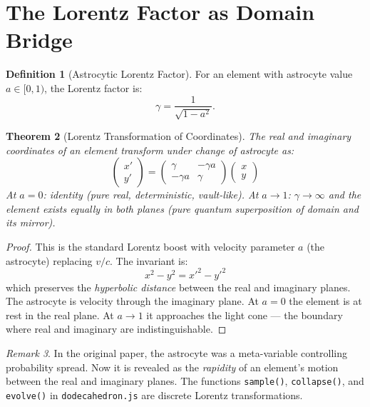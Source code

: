 \documentclass[12pt,a4paper]{article}
\newtheorem{theorem}{Theorem}[section]
\theoremstyle{definition}
\newtheorem{definition}[theorem]{Definition}
\theoremstyle{remark}
\newtheorem{remark}[theorem]{Remark}
\begin{document}
\section{The Lorentz Factor as Domain Bridge}\label{sec:lorentz}

\begin{definition}[Astrocytic Lorentz Factor]
For an element with astrocyte value $a \in [0, 1)$, the Lorentz factor is:
\begin{equation}\label{eq:gamma}
  \gamma = \frac{1}{\sqrt{1 - a^2}}.
\end{equation}
\end{definition}

\begin{theorem}[Lorentz Transformation of Coordinates]\label{thm:lorentz}
The real and imaginary coordinates of an element transform under change
of astrocyte as:
\begin{equation}\label{eq:lorentz-transform}
  \begin{pmatrix} x' \\ y' \end{pmatrix}
  = \begin{pmatrix} \gamma & -\gamma a \\ -\gamma a & \gamma \end{pmatrix}
  \begin{pmatrix} x \\ y \end{pmatrix}
\end{equation}
At $a = 0$: identity (pure real, deterministic, vault-like).
At $a \to 1$: $\gamma \to \infty$ and the element exists equally in both
planes (pure quantum superposition of domain and its mirror).
\end{theorem}

\begin{proof}
This is the standard Lorentz boost with velocity parameter $a$ (the
astrocyte) replacing $v/c$. The invariant is:
\begin{equation}
  x^2 - y^2 = x'^2 - y'^2
\end{equation}
which preserves the \emph{hyperbolic distance} between the real and
imaginary planes. The astrocyte is velocity through the imaginary plane.
At $a = 0$ the element is at rest in the real plane. At $a \to 1$ it
approaches the light cone --- the boundary where real and imaginary are
indistinguishable.
\end{proof}

\begin{remark}
In the original paper, the astrocyte was a meta-variable controlling
probability spread. Now it is revealed as the \emph{rapidity} of an element's
motion between the real and imaginary planes. The functions
\texttt{sample()}, \texttt{collapse()}, and \texttt{evolve()} in
\texttt{dodecahedron.js} are discrete Lorentz transformations.
\end{remark}
\end{document}
